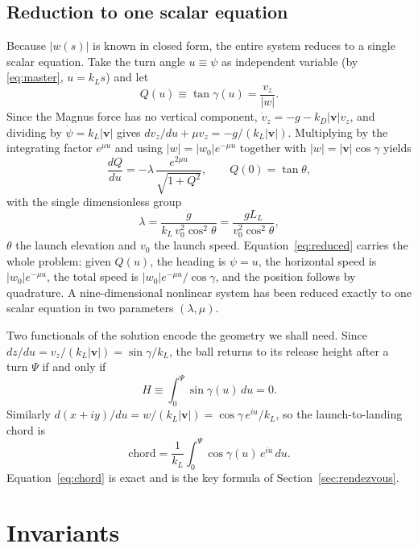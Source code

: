 \documentclass[aip,amsmath,amssymb,preprint,floatfix]{revtex4-2}
\newcommand{\kL}{k_{L}}
\newcommand{\kD}{k_{D}}
\newcommand{\LL}{L_{L}}
\newcommand{\vv}{\bm{v}}
\begin{document}
\subsection{Reduction to one scalar equation}

Because $|w(s)|$ is known in closed form, the entire system reduces to a single
scalar equation. Take the turn angle $u\equiv\psi$ as independent variable (by
\eqref{eq:master}, $u=\kL s$) and let
\begin{equation}
Q(u) \equiv \tan\gamma(u) = \frac{v_z}{|w|}.
\end{equation}
Since the Magnus force has no vertical component, $\dot v_z=-g-\kD|\vv|v_z$, and
dividing by $\dot\psi=\kL|\vv|$ gives
$dv_z/du+\mu v_z=-g/(\kL|\vv|)$. Multiplying by the integrating factor $e^{\mu u}$
and using $|w|=|w_0|e^{-\mu u}$ together with $|w|=|\vv|\cos\gamma$ yields
\begin{equation}
\boxed{\;\frac{dQ}{du} = -\lambda\,\frac{e^{2\mu u}}{\sqrt{1+Q^2}},\qquad
Q(0)=\tan\theta,\;}
\label{eq:reduced}
\end{equation}
with the single dimensionless group
\begin{equation}
\lambda = \frac{g}{\kL\,v_0^2\cos^2\theta} = \frac{g\LL}{v_0^2\cos^2\theta},
\label{eq:lambda}
\end{equation}
$\theta$ the launch elevation and $v_0$ the launch speed. Equation~\eqref{eq:reduced}
carries the whole problem: given $Q(u)$, the heading is $\psi=u$, the horizontal
speed is $|w_0|e^{-\mu u}$, the total speed is $|w_0|e^{-\mu u}/\cos\gamma$, and the
position follows by quadrature. A nine-dimensional nonlinear system has been reduced
exactly to one scalar equation in two parameters $(\lambda,\mu)$.

Two functionals of the solution encode the geometry we shall need. Since
$dz/du=v_z/(\kL|\vv|)=\sin\gamma/\kL$, the ball returns to its release height after a
turn $\Psi$ if and only if
\begin{equation}
H \equiv \int_0^{\Psi}\sin\gamma(u)\,du = 0 .
\label{eq:closure}
\end{equation}
Similarly $d(x+iy)/du=w/(\kL|\vv|)=\cos\gamma\,e^{iu}/\kL$, so the launch-to-landing
chord is
\begin{equation}
\text{chord} = \frac{1}{\kL}\int_0^{\Psi}\cos\gamma(u)\,e^{iu}\,du .
\label{eq:chord}
\end{equation}
Equation~\eqref{eq:chord} is exact and is the key formula of
Section~\ref{sec:rendezvous}.

\section{Invariants}
\label{sec:consequences}
\end{document}
